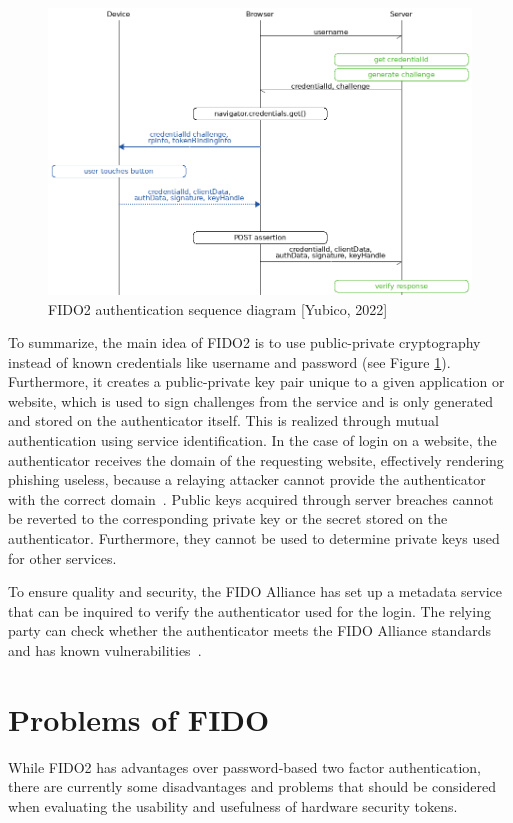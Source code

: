 \documentclass[runningheads]{llncs}
\begin{document}
\begin{figure}[ht]
  \centering
  \includegraphics[width=\textwidth]{references/fido_flow_by_yubico.png}
  \caption{FIDO2 authentication sequence diagram [Yubico, 2022]}
  \label{figure_one}
\end{figure}

To summarize, the main idea of FIDO2 is to use public-private cryptography instead of known credentials like username and password (see Figure \ref{figure_one}). Furthermore, it creates a public-private key pair unique to a given application or website, which is used to sign challenges from the service and is only generated and stored on the authenticator itself. This is realized through mutual authentication using service identification. In the case of login on a website, the authenticator receives the domain of the requesting website, effectively rendering phishing useless, because a relaying attacker cannot provide the authenticator with the correct domain~\cite{274610}. Public keys acquired through server breaches cannot be reverted to the corresponding private key or the secret stored on the authenticator. Furthermore, they cannot be used to determine private keys used for other services.

To ensure quality and security, the FIDO Alliance has set up a metadata service that can be inquired to verify the authenticator used for the login. The relying party can check whether the authenticator meets the FIDO Alliance standards and has known vulnerabilities~\cite{9099190}.

\section{Problems of FIDO}
While FIDO2 has advantages over password-based two factor authentication, there are currently some disadvantages and problems that should be considered when evaluating the usability and usefulness of hardware security tokens.
\end{document}
